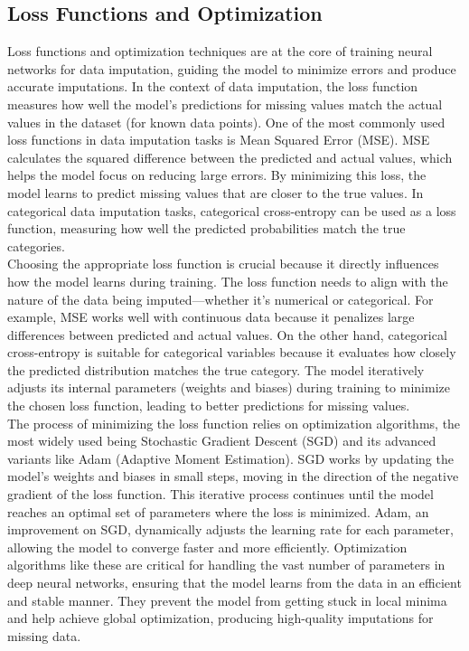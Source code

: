 \documentclass{article}
\begin{document}
\subsection{Loss Functions and Optimization}
Loss functions and optimization techniques are at the core of training neural networks for data imputation, guiding the model to minimize errors and produce accurate imputations. In the context of data imputation, the loss function measures how well the model’s predictions for missing values match the actual values in the dataset (for known data points). One of the most commonly used loss functions in data imputation tasks is Mean Squared Error (MSE). MSE calculates the squared difference between the predicted and actual values, which helps the model focus on reducing large errors. By minimizing this loss, the model learns to predict missing values that are closer to the true values. In categorical data imputation tasks, categorical cross-entropy can be used as a loss function, measuring how well the predicted probabilities match the true categories.
\\
Choosing the appropriate loss function is crucial because it directly influences how the model learns during training. The loss function needs to align with the nature of the data being imputed—whether it’s numerical or categorical. For example, MSE works well with continuous data because it penalizes large differences between predicted and actual values. On the other hand, categorical cross-entropy is suitable for categorical variables because it evaluates how closely the predicted distribution matches the true category. The model iteratively adjusts its internal parameters (weights and biases) during training to minimize the chosen loss function, leading to better predictions for missing values.
\\
The process of minimizing the loss function relies on optimization algorithms, the most widely used being Stochastic Gradient Descent (SGD) and its advanced variants like Adam (Adaptive Moment Estimation). SGD works by updating the model’s weights and biases in small steps, moving in the direction of the negative gradient of the loss function. This iterative process continues until the model reaches an optimal set of parameters where the loss is minimized. Adam, an improvement on SGD, dynamically adjusts the learning rate for each parameter, allowing the model to converge faster and more efficiently. Optimization algorithms like these are critical for handling the vast number of parameters in deep neural networks, ensuring that the model learns from the data in an efficient and stable manner. They prevent the model from getting stuck in local minima and help achieve global optimization, producing high-quality imputations for missing data.
\pagebreak
\end{document}
